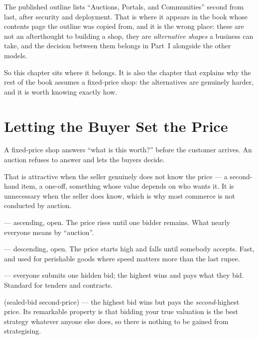 The published outline lists ``Auctions, Portals, and Communities'' second from
last, after security and deployment. That is where it appears in the book whose
contents page the outline was copied from, and it is the wrong place: these are
not an afterthought to building a shop, they are \emph{alternative shapes} a
business can take, and the decision between them belongs in Part~I alongside
the other models.

So this chapter sits where it belongs. It is also the chapter that explains why
the rest of the book assumes a fixed-price shop: the alternatives are
genuinely harder, and it is worth knowing exactly how.

\section{Letting the Buyer Set the Price}

A fixed-price shop answers ``what is this worth?'' before the customer
arrives. An auction refuses to answer and lets the buyers decide.

That is attractive when the seller genuinely does not know the price --- a
second-hand item, a one-off, something whose value depends on who wants it. It
is unnecessary when the seller does know, which is why most commerce is not
conducted by auction.

\begin{definitionbox}
 --- ascending, open. The price rises until one bidder
remains. What nearly everyone means by ``auction''.

\smallskip
{} --- descending, open. The price starts high and falls
until somebody accepts. Fast, and used for perishable goods where speed matters
more than the last rupee.

\smallskip
{} --- everyone submits one hidden bid; the highest
wins and pays what they bid. Standard for tenders and contracts.

\smallskip
{} (sealed-bid second-price) --- the highest bid wins but
pays the \emph{second}-highest price. Its remarkable property is that bidding
your true valuation is the best strategy whatever anyone else does, so there is
nothing to be gained from strategising.
\end{definitionbox}

